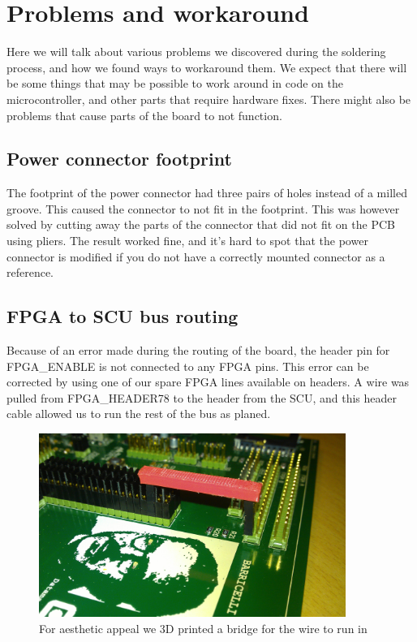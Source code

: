 \section {Problems and workaround}
Here we will talk about various problems we discovered during the soldering process, and how we found ways to workaround them.
We expect that there will be some things that may be possible to work around in code on the microcontroller, and other parts that require hardware fixes.
There might also be problems that cause parts of the board to not function.

\subsection{ Power connector footprint }

The footprint of the power connector had three pairs of holes instead of a milled groove.
This caused the connector to not fit in the footprint.
This was however solved by cutting away the parts of the connector that did not fit on the PCB using pliers.
The result worked fine, and it's hard to spot that the power connector is modified if you do not have a correctly mounted connector as a reference.

\subsection{ FPGA to SCU bus routing }

Because of an error made during the routing of the board, the header pin for FPGA\_ENABLE is not connected to any FPGA pins.
This error can be corrected by using one of our spare FPGA lines available on headers.
A wire was pulled from FPGA\_HEADER78 to the header from the SCU, and this header cable allowed us to run the rest of the bus as planed.

\begin{figure}[H]
\centering
\includegraphics[width=10cm,keepaspectratio]{pcb/enable_hack.jpg}
\caption{For aesthetic appeal we 3D printed a bridge for the wire to run in}
\label{figure:vreghack}
\end{figure}

